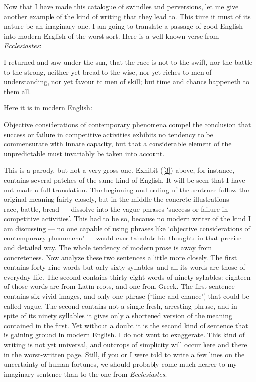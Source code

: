 \documentclass[12pt]{article}
\begin{document}
Now that I have made this catalogue of swindles and perversions, let me give another example of the kind of writing that they lead to. This time it must of its nature be an imaginary one. I am going to translate a passage of good English into modern English of the worst sort. Here is a well-known verse from \textit{Ecclesiastes}:
\begin{displayquote}
\small
I returned and saw under the sun, that the race is not to the swift, nor the battle to the strong, neither yet bread to the wise, nor yet riches to men of understanding, nor yet favour to men of skill; but time and chance happeneth to them all.
\end{displayquote}

Here it is in modern English:
\begin{displayquote}
\small Objective considerations of contemporary phenomena compel the conclusion that success or failure in competitive activities exhibits no tendency to be commensurate with innate capacity, but that a considerable element of the unpredictable must invariably be taken into account.
\end{displayquote}
This is a parody, but not a very gross one. Exhibit (\ref{3}) above, for instance, contains several patches of the same kind of English. It will be seen that I have not made a full translation. The beginning and ending of the sentence follow the original meaning fairly closely, but in the middle the concrete illustrations — race, battle, bread — dissolve into the vague phrases `success or failure in competitive activities’. This had to be so, because no modern writer of the kind I am discussing — no one capable of using phrases like ‘objective considerations of contemporary phenomena’ — would ever tabulate his thoughts in that precise and detailed way. The whole tendency of modern prose is away from concreteness. Now analyze these two sentences a little more closely. The first contains forty-nine words but only sixty syllables, and all its words are those of everyday life. The second contains thirty-eight words of ninety syllables: eighteen of those words are from Latin roots, and one from Greek. The first sentence contains six vivid images, and only one phrase (`time and chance’) that could be called vague. The second contains not a single fresh, arresting phrase, and in spite of its ninety syllables it gives only a shortened version of the meaning contained in the first. Yet without a doubt it is the second kind of sentence that is gaining ground in modern English. I do not want to exaggerate. This kind of writing is not yet universal, and outcrops of simplicity will occur here and there in the worst-written page. Still, if you or I were told to write a few lines on the uncertainty of human fortunes, we should probably come much nearer to my imaginary sentence than to the one from \textit{Ecclesiastes}.
\end{document}
